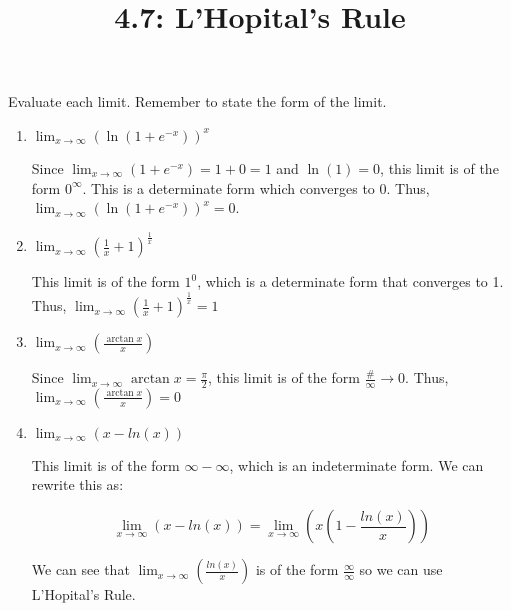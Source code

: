 \documentclass[nooutcomes]{ximera}
\title{4.7: L'Hopital's Rule}
\begin{document}
\begin{abstract}
\end{abstract}
\maketitle

\begin{problem}

Evaluate each limit.  Remember to state the form of the limit.
  \begin{enumerate}
  \item  $\lim_{x \to \infty}\left( \ln (1 + e^{-x}) \right)^x $
    \begin{freeResponse}
      Since $\lim_{x \to \infty} (1 + e^{-x}) = 1 + 0 = 1$ and $\ln (1) = 0$, this limit is of the form $0^{\infty}$.
      This is a determinate form which converges to $0$.
      Thus, $\lim_{x \to \infty} \left( \ln (1 + e^{-x}) \right)^x = 0$.
    \end{freeResponse}
    
  \item  $\lim_{x \to \infty} \left( \frac{1}{x} + 1 \right)^{\frac{1}{x}} $
    \begin{freeResponse}
      This limit is of the form $1^0$, which is a determinate form that converges to 1.
      Thus, $\lim_{x \to \infty} \left( \frac{1}{x} + 1 \right)^{\frac{1}{x}} = 1 $
    \end{freeResponse}
    
  \item  $\lim_{x \to \infty} \left( \frac{\arctan x}{x} \right) $
    \begin{freeResponse}
      Since $\lim_{x \to \infty} \arctan x = \frac{\pi}{2}$, this limit is of the form $\frac{\text{\#}}{\infty} \to 0$.
      Thus, $\lim_{x \to \infty} \left( \frac{\arctan x}{x} \right) = 0$  
    \end{freeResponse}
    
  \item  $\lim_{x \to \infty} (x-ln(x)) $
    \begin{freeResponse}
      This limit is of the form $\infty - \infty$, which is an indeterminate form.  We can rewrite this as:
   
      $$\lim_{x \to \infty} (x-ln(x))= \lim_{x \to \infty} \left(x\left(1-\frac{ln(x)}{x}\right)\right)$$
     
     We can see that $\lim_{x \to \infty}\left(\frac{ln(x)}{x}\right)$ is of the form $\frac{\infty}{\infty}$ so we can use L'Hopital's Rule.
     

\end{freeResponse}
\end{enumerate}
\end{problem}
\end{document}
